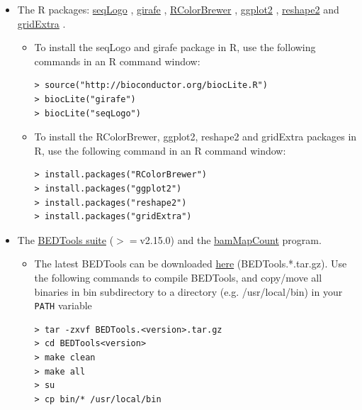 \documentclass[12pt]{article}
\begin{document}
\begin{itemize}
 \item The R packages:  \href{http://www.bioconductor.org/packages/2.2/bioc/html/seqLogo.html}{ seqLogo} \cite{OliverseqLogo}, \href{http://www.bioconductor.org/packages/2.6/bioc/html/girafe.html}{ girafe} \cite{Joern2010},  \href{http://cran.r-project.org/web/packages/RColorBrewer/index.html}{ RColorBrewer} \cite{Erich2011}, \href{http://ggplot2.org/}{ ggplot2} \cite{Wickham2009}, \href{http://cran.r-project.org/web/packages/reshape2/index.html}{ reshape2} \cite{Wickham2007} and \href{http://cran.r-project.org/web/packages/gridExtra/}{ gridExtra} \cite{Auguie2012}.

\begin{itemize}
 \item To install the seqLogo and girafe package in R, use the following commands in an R command window:
\begin{verbatim}
> source("http://bioconductor.org/biocLite.R")
> biocLite("girafe")
> biocLite("seqLogo")

\end{verbatim} 

 \item To install the RColorBrewer, ggplot2, reshape2 and gridExtra packages in R, use the following command in an R command window:
\begin{verbatim}
> install.packages("RColorBrewer")
> install.packages("ggplot2")
> install.packages("reshape2")
> install.packages("gridExtra")
\end{verbatim} 
\end{itemize}

 \item The \href{http://code.google.com/p/bedtools/}{BEDTools suite} ($>=$v2.15.0) \cite{Quinlan2010} and the \href{
http://xfer.curie.fr/get/nil/2Rpz9IfJKcZ/BEDTools_MapCount_ColorTag.tar.gz}{ bamMapCount} program.

\begin{itemize}
 \item The latest BEDTools can be downloaded \href{http://code.google.com/p/bedtools/downloads/list}{ here} (BEDTools.*.tar.gz). Use the following commands to compile BEDTools, and copy/move all binaries in bin subdirectory to a directory (e.g. /usr/local/bin) in your \verb+PATH+ variable
\begin{verbatim}
> tar -zxvf BEDTools.<version>.tar.gz 
> cd BEDTools<version>
> make clean
> make all
> su
> cp bin/* /usr/local/bin
\end{verbatim} 
\end{itemize}


\end{itemize}
\end{document}
